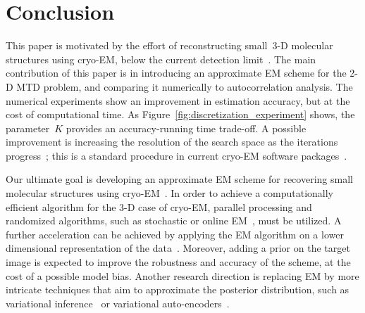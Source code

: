 \documentclass{article}
\begin{document}
\section{Conclusion}
\label{sec:conclusion}
This paper is motivated by the effort of reconstructing small~\mbox{3-D} molecular structures using \mbox{cryo-EM}, below the current detection limit~\cite{bendory2018toward}. The main contribution of this paper is in introducing an approximate EM scheme for the 2-D MTD problem, and comparing it numerically to autocorrelation analysis. The numerical experiments show an improvement in estimation accuracy, but at the cost of computational time. As Figure~\ref{fig:discretization_experiment} shows, the parameter~$K$ provides an accuracy-running time trade-off. A possible improvement is increasing the resolution of the search space as the iterations progress~\cite{lan2020multi}; this is a standard procedure in current cryo-EM software packages~\cite{scheres2012relion, punjani2017cryosparc}.

Our ultimate goal is developing an approximate EM scheme for recovering small molecular structures using \mbox{cryo-EM}~\cite{bendory2018toward}. %
In order to achieve a computationally efficient algorithm for the \mbox{3-D} case of \mbox{cryo-EM}, parallel processing and randomized algorithms, such as stochastic or online EM~\cite{nielsen2000stochastic, chen2018stochastic, liang2009online, cappe2009line, cappe2011online}, must be utilized.
A further acceleration can be achieved by applying the EM algorithm on a lower dimensional representation of the data~\cite{dvornek2015subspaceem}. Moreover, adding a prior on the target image is expected to improve the robustness and accuracy of the scheme, at the cost of a possible model bias. Another research direction is replacing EM by more intricate techniques that aim to approximate the posterior distribution, such as variational inference~\cite{blei2017variational} or variational auto-encoders~\cite{rosenbaum2021inferring}.

\vfill
\newpage



\end{document}
